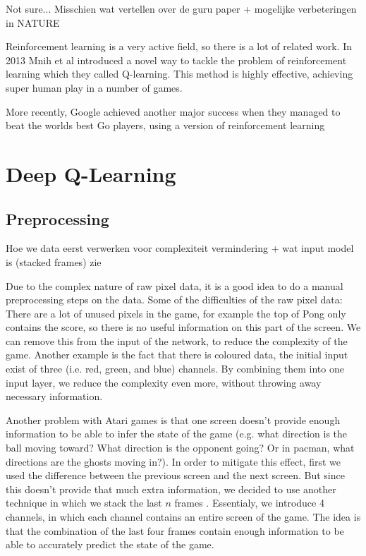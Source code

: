 \documentclass{article}
\begin{document}
Not sure... Misschien wat vertellen over de guru paper \cite{mnih2013playing} + mogelijke verbeteringen in NATURE \cite{mnih2015human}

Reinforcement learning is a very active field, so there is a lot of related work. In 2013 Mnih et al introduced a novel way to tackle the problem of reinforcement learning which they called Q-learning. This method is highly effective, achieving super human play in a number of games.

More recently, Google achieved another major success when they managed to beat the worlds best Go players, using a version of reinforcement learning

\section{Deep Q-Learning}

\subsection{Preprocessing}
Hoe we data eerst verwerken voor complexiteit vermindering + wat input model is (stacked frames) zie \cite{mnih2013playing}

Due to the complex nature of raw pixel data, it is a good idea to do a manual preprocessing steps on the data. Some of the difficulties of the raw pixel data: There are a lot of unused pixels in the game, for example the top of Pong only contains the score, so there is no useful information on this part of the screen. We can remove this from the input of the network, to reduce the complexity of the game. Another example is the fact that there is coloured data, the initial input exist of three (i.e. red, green, and blue) channels. By combining them into one input layer, we reduce the complexity even more, without throwing away necessary information.

Another problem with Atari games is that one screen doesn't provide enough information to be able to infer the state of the game (e.g. what direction is the ball moving toward? What direction is the opponent going? Or in pacman, what directions are the ghosts moving in?). In order to mitigate this effect, first we used the difference between the previous screen and the next screen. But since this doesn't provide that much extra information, we decided to use another technique in which we stack the last $n$ frames \cite{mnih2013playing}. Essentialy, we introduce 4 channels, in which each channel contains an entire screen of the game. The idea is that the combination of the last four frames contain enough information to be able to accurately predict the state of the game.
\end{document}
